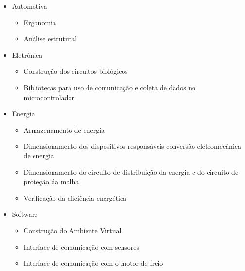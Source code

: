 \begin{itemize}
	\item Automotiva
		\begin{itemize}
		\item Ergonomia
		\item Análise estrutural
		\end{itemize}
	\item Eletrônica
		\begin{itemize}
		\item Construção dos circuitos biológicos
		\item Bibliotecas para uso de comunicação e coleta de dados no microcontrolador
		\end{itemize}
	\item Energia
		\begin{itemize}
		\item Armazenamento de energia
		\item Dimensionamento dos dispositivos responsáveis conversão eletromecânica de energia
		\item Dimensionamento do circuito de distribuição da energia e do circuito de proteção da malha
		\item Verificação da eficiência energética
		\end{itemize}
	\item Software
		\begin{itemize}
		\item Construção do Ambiente Virtual
		\item Interface de comunicação com sensores
		\item Interface de comunicação com o motor de freio
		\end{itemize}
\end{itemize}
